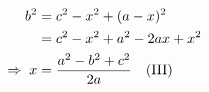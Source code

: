 \documentclass[preview]{standalone}
\begin{document}
\begin{align*}
\special{dvisvgm:raw <g id='unique000'>}b^2 &= c^2 - x^2 + (a-x)^2 \\ \special{dvisvgm:raw </g>}\special{dvisvgm:raw <g id='unique001'>}    &= c^2 - x^2 + a^2 - 2ax + x^2 \\ \special{dvisvgm:raw </g>}\special{dvisvgm:raw <g id='unique002'>}\Rightarrow\; x &= \frac{a^2 - b^2 + c^2}{2a} \special{dvisvgm:raw </g>}\special{dvisvgm:raw <g id='unique003'>}\quad \text{(III)}\special{dvisvgm:raw </g>}
\end{align*}
\end{document}

